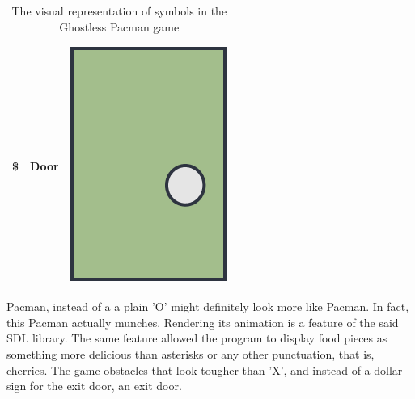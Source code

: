 \begin{table}[H]
\begin{tabular}{ c c c }
        \$ & Door & \includegraphics[scale=0.1]{assets/door_sample.png}\\
        \hline
    \end{tabular}
    \caption{The visual representation of symbols in the Ghostless Pacman game}
    \label{tab:1}
\end{table}

Pacman, instead of a a plain 'O' might definitely look more like Pacman. In fact, this Pacman actually munches. Rendering its animation is a feature of the said SDL
library. The same feature allowed the program to display food pieces as
something more delicious than asterisks or any other punctuation, that is,
cherries. The game obstacles that look tougher than 'X', and instead of a dollar
sign for the exit door, an exit door.\\